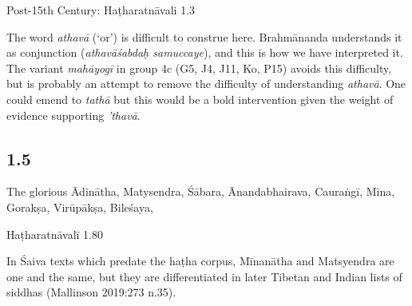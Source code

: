 \begin{ekdosis}
\begin{testimonia}[hp01_004]
Post-15th Century:
Haṭharatnāvali 1.3

\begin{versinnote}
\end{versinnote}

\end{testimonia}

\begin{philcomm}[hp01_004]   
The word \emph{athavā} (‘or’) is difficult to construe here. Brahmānanda understands it as conjunction (\emph{athavāśabdaḥ samuccaye}), and this is how we have interpreted it. The variant \emph{mahāyogī} in group 4c (G5, J4, J11, Ko, P15) avoids this difficulty, but is probably an attempt to remove the difficulty of understanding \emph{athavā}. One could emend to \emph{tathā} but this would be a bold intervention given the weight of evidence supporting \emph{’thavā}.   
\end{philcomm}

\subsection*{1.5}
\begin{translation}[hp01_005]
The glorious Ādinātha, Matysendra, Śābara, Ānandabhairava, Cauraṅgī, Mīna, Gorakṣa, Virūpākṣa, Bileśaya,
\end{translation}

\begin{testimonia}[hp01_005]
Haṭharatnāvalī 1.80

\begin{versinnote}
\end{versinnote}

\end{testimonia}

\begin{philcomm}[hp01_005]     
In Śaiva texts which predate the haṭha corpus, Mīnanātha and Matsyendra are one and the same, but they are differentiated in later Tibetan and Indian lists of siddhas (Mallinson 2019:273 n.35).   
\end{philcomm}


\end{ekdosis}
